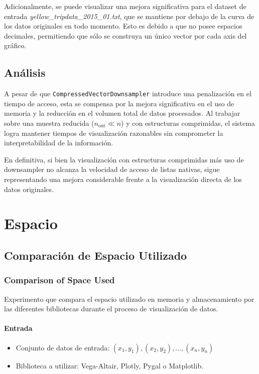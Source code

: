 Adicionalmente, se puede visualizar una mejora significativa para el dataset de entrada \textit{yellow\_tripdata\_2015\_01.txt}, que se mantiene por debajo de la curva de los datos originales en todo momento. Esto es debido a que no posee espacios decimales, permitiendo que sólo se construya un único vector por cada axis del gráfico.

\subsection{Análisis}

A pesar de que \texttt{CompressedVectorDownsampler} introduce una penalización en el tiempo de acceso, esta se compensa por la mejora significativa en el uso de memoria y la reducción en el volumen total de datos procesados. Al trabajar sobre una muestra reducida (\(n_{\text{out}} \ll n\)) y con estructuras comprimidas, el sistema logra mantener tiempos de visualización razonables sin comprometer la interpretabilidad de la información.

En definitiva, si bien la visualización con estructuras comprimidas más uso de downsampler no alcanza la velocidad de acceso de listas nativas, sigue representando una mejora considerable frente a la visualización directa de los datos originales. 


\newpage
\section{Espacio}

\subsection{Comparación de Espacio Utilizado}
\subsubsection{Comparison of Space Used}
\label{comparison_of_space_used}

Experimento que compara el espacio utilizado en memoria y almacenamiento por las diferentes bibliotecas durante el proceso de visualización de datos.

\paragraph{Entrada}
\begin{itemize}
    \item Conjunto de datos de entrada: \( (x_1, y_1), (x_2, y_2), \ldots, (x_n, y_n) \)
    \item Biblioteca a utilizar: Vega-Altair, Plotly, Pygal o Matplotlib.
\end{itemize}

